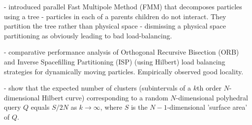 {\cite{SinghHoHe93} - introduced parallel Fast Multipole Method (FMM) 
that decomposes particles using a tree - particles in each of 
a parents children do not interact.  They partition the tree
rather than physical space - dismissing a physical space partitioning
as obviously leading to bad load-balancing.

\cite{PilkingtonBa96} - comparative performance analysis of 
Orthogonal Recursive Bisection (ORB) and Inverse Spacefilling 
Partitioning (ISP) (using Hilbert) load balancing strategies 
for dynamically moving particles.  Empirically observed good
locality.

\cite{MoonJaFa96} - show that the expected number of clusters (subintervals
of a $k$th order $N$-dimensional Hilbert curve) corresponding to a 
random $N$-dimensional polyhedral query $Q$ equals $S/{2N}$ as
$k \rightarrow \infty$, where $S$ is the $N-1$-dimensional 
'surface area' of $Q$.  
}















